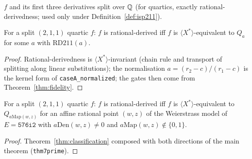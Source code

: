 \begin{definition}\label{def:rdpoly}\leanok
{}
$f$ and its first three derivatives split over $\mathbb{Q}$ (for quartics, exactly
rational-derivedness; used only under Definition~\ref{def:isp211}).
\end{definition}

\begin{theorem}\label{thm:classification}\leanok
{}
For a split $(2,1,1)$ quartic $f$: $f$ is rational-derived iff $f$ is
$\langle X^{*}\rangle$-equivalent to $Q_{a}$ for some $a$ with
$\mathrm{RD211}(a)$.
\end{theorem}
\begin{proof}\leanok
Rational-derivedness is $\langle X^{*}\rangle$-invariant (chain rule and
transport of splitting along linear substitutions); the normalisation
$a=(r_{2}-c)/(r_{1}-c)$ is the kernel form of \texttt{caseA\_normalized};
the gates then come from Theorem~\ref{thm:fidelity}.
\end{proof}

\begin{theorem}\label{thm:classcurve}\leanok
{}
For a split $(2,1,1)$ quartic $f$: $f$ is rational-derived iff $f$ is
$\langle X^{*}\rangle$-equivalent to $Q_{a\mathrm{Map}(w,z)}$ for an affine
rational point $(w,z)$ of the Weierstrass model of $E=\texttt{576i2}$ with
$a\mathrm{Den}(w,z)\neq0$ and $a\mathrm{Map}(w,z)\notin\{0,1\}$.
\end{theorem}
\begin{proof}\leanok
Theorem~\ref{thm:classification} composed with both directions of the main
theorem (\texttt{thm7prime}).
\end{proof}
